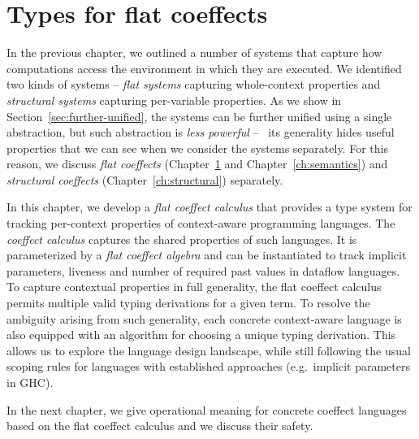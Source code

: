 
\chapter{Types for flat coeffects}
\label{ch:flat}

In the previous chapter, we outlined a number of systems that capture how computations
access the environment in which they are executed. We identified two kinds of systems --
\emph{flat systems} capturing whole-context properties and \emph{structural systems} capturing
per-variable properties. As we show in Section~\ref{sec:further-unified}, the systems can be
further unified using a single abstraction, but such abstraction is \emph{less powerful} -- \ie~its
generality hides useful properties that we can see when we consider the systems separately. For
this reason, we discuss \emph{flat coeffects} (Chapter~\ref{ch:flat} and Chapter~\ref{ch:semantics})
and \emph{structural coeffects} (Chapter~\ref{ch:structural}) separately.

In this chapter, we develop a \emph{flat coeffect calculus} that provides a type system for
tracking per-context properties of context-aware programming languages. The \emph{coeffect
calculus} captures the shared properties of such languages. It is parameterized by a \emph{flat
coeffect algebra} and can be instantiated to track implicit parameters, liveness and number of
required past values in dataflow languages.
To capture contextual properties in full generality, the flat coeffect calculus permits multiple
valid typing derivations for a given term. To resolve the ambiguity arising from such generality,
each concrete context-aware language is also equipped with an algorithm for choosing a unique
typing derivation. This allows us to explore the language design landscape, while still following
the usual scoping rules for languages with established approaches (e.g.~implicit parameters in
GHC).

In the next chapter, we give operational meaning for concrete coeffect
languages based on the flat coeffect calculus and we discuss their safety.


